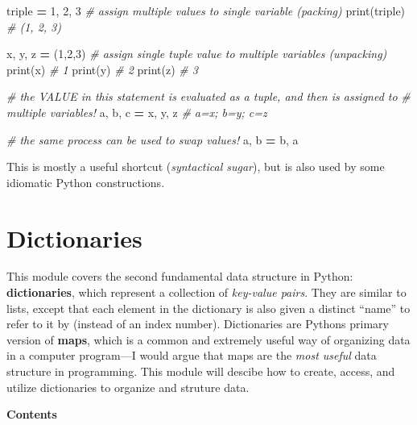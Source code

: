 \documentclass[]{book}
\newenvironment{Shaded}{\begin{snugshade}}{\end{snugshade}}
\newcommand{\DecValTok}[1]{\textcolor[rgb]{0.00,0.00,0.81}{#1}}
\newcommand{\CommentTok}[1]{\textcolor[rgb]{0.56,0.35,0.01}{\textit{#1}}}
\newcommand{\OperatorTok}[1]{\textcolor[rgb]{0.81,0.36,0.00}{\textbf{#1}}}
\newcommand{\BuiltInTok}[1]{#1}
\newcommand{\NormalTok}[1]{#1}
\begin{document}
\begin{Shaded}
\begin{Highlighting}[]
\NormalTok{triple }\OperatorTok{=} \DecValTok{1}\NormalTok{, }\DecValTok{2}\NormalTok{, }\DecValTok{3}  \CommentTok{# assign multiple values to single variable (packing)}
\BuiltInTok{print}\NormalTok{(triple)  }\CommentTok{# (1, 2, 3)}


\NormalTok{x, y, z }\OperatorTok{=}\NormalTok{ (}\DecValTok{1}\NormalTok{,}\DecValTok{2}\NormalTok{,}\DecValTok{3}\NormalTok{)  }\CommentTok{# assign single tuple value to multiple variables (unpacking)}
\BuiltInTok{print}\NormalTok{(x)  }\CommentTok{# 1}
\BuiltInTok{print}\NormalTok{(y)  }\CommentTok{# 2}
\BuiltInTok{print}\NormalTok{(z)  }\CommentTok{# 3}

\CommentTok{# the VALUE in this statement is evaluated as a tuple, and then is assigned to}
\CommentTok{# multiple variables!}
\NormalTok{a, b, c }\OperatorTok{=}\NormalTok{ x, y, z  }\CommentTok{# a=x; b=y; c=z}

\CommentTok{# the same process can be used to swap values!}
\NormalTok{a, b }\OperatorTok{=}\NormalTok{ b, a}
\end{Highlighting}
\end{Shaded}

This is mostly a useful shortcut (\emph{syntactical sugar}), but is also
used by some idiomatic Python constructions.

\hypertarget{dictionaries}{\chapter{Dictionaries}\label{dictionaries}}

This module covers the second fundamental data structure in Python:
\textbf{dictionaries}, which represent a collection of \emph{key-value
pairs}. They are similar to lists, except that each element in the
dictionary is also given a distinct ``name'' to refer to it by (instead
of an index number). Dictionaries are Pythons primary version of
\textbf{maps}, which is a common and extremely useful way of organizing
data in a computer program---I would argue that maps are the \emph{most
useful} data structure in programming. This module will descibe how to
create, access, and utilize dictionaries to organize and struture data.

\textbf{Contents}
\end{document}
